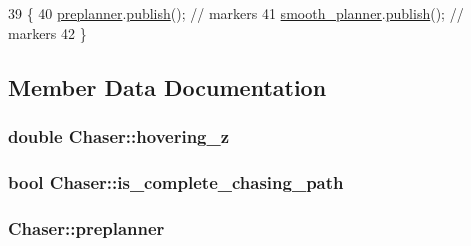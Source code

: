 \begin{DoxyCode}
39                             \{
40     \hyperlink{class_chaser_a090edb4f4bdb9da847f0980d3b188c57}{preplanner}.\hyperlink{class_preplanner_a35f3bfb85ba14d7f0c72bda1522df69e}{publish}(); \textcolor{comment}{// markers     }
41     \hyperlink{class_chaser_aab300ace64ce35c982c546cfce13f476}{smooth\_planner}.\hyperlink{class_smooth_planner_a2996c73522e93adff70eb68e18c55951}{publish}();  \textcolor{comment}{// markers }
42 \}
\end{DoxyCode}


\subsection{Member Data Documentation}
\subsubsection[{\texorpdfstring{hovering\+\_\+z}{hovering_z}}]{\setlength{\rightskip}{0pt plus 5cm}double Chaser\+::hovering\+\_\+z\hspace{0.3cm}{\ttfamily [private]}}\hypertarget{class_chaser_a793c1d8800e02e5b7c13f973cacc5eff}{}\label{class_chaser_a793c1d8800e02e5b7c13f973cacc5eff}
\subsubsection[{\texorpdfstring{is\+\_\+complete\+\_\+chasing\+\_\+path}{is_complete_chasing_path}}]{\setlength{\rightskip}{0pt plus 5cm}bool Chaser\+::is\+\_\+complete\+\_\+chasing\+\_\+path}\hypertarget{class_chaser_a53af032471ad6bdc828c4eae78085813}{}\label{class_chaser_a53af032471ad6bdc828c4eae78085813}
\subsubsection[{\texorpdfstring{preplanner}{preplanner}}]{ Chaser\+::preplanner\hspace{0.3cm}{\ttfamily [private]}}\hypertarget{class_chaser_a090edb4f4bdb9da847f0980d3b188c57}{}\label{class_chaser_a090edb4f4bdb9da847f0980d3b188c57}
